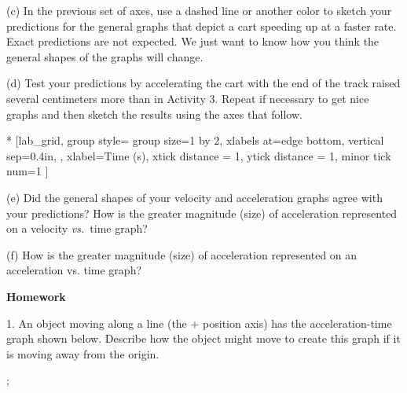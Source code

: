 (c) In the previous set of axes, use a dashed line or another color to sketch
your predictions for the general graphs that depict a cart speeding up at a
faster rate. Exact predictions are not expected. We just want to know how you
think the general shapes of the graphs will change.

\pagebreak[2]
(d) Test your predictions by accelerating the cart with the end of the track raised several centimeters more than in Activity 3. Repeat if necessary to get nice graphs and then sketch the results using the axes that follow.

\begin{lab_groupplot}*{}
					[lab_grid,
	group style={
		group size=1 by 2,
		xlabels at=edge bottom,
		vertical sep=0.4in,
		},
	xlabel=Time (s),
	xtick distance = 1, 
	ytick distance = 1, 
	minor tick num=1
	]
\nextgroupplot[
	ylabel={Velocity (m/s)},
	]
\nextgroupplot[
	ylabel={Acceleration (m/s$^2$)},
	]
\end{lab_groupplot}

(e) Did the general shapes of your velocity and acceleration graphs agree with
your predictions? How is the greater magnitude (size) of acceleration represented
on a velocity \textit{vs.}~time graph? 
\answerspace{25mm}

(f) How is the greater magnitude (size) of acceleration represented on an acceleration
vs. time graph? 
\answerspace{25mm}

\pagebreak[2]
\textbf{Homework} 

1. An object moving along a line (the + position axis) has the acceleration-time
graph shown below. Describe how the object might move to create this graph if
it is moving away from the origin.

\hspace{0.4in}
\begin{lab_axis}[lab_noticks_2quads,
	height = {1.2in}, width = {2.4in},
	xlabel={Time},
	ylabel={Acceleration},
	plus_minus_zero_labels,
	]
;
\end{lab_axis}

